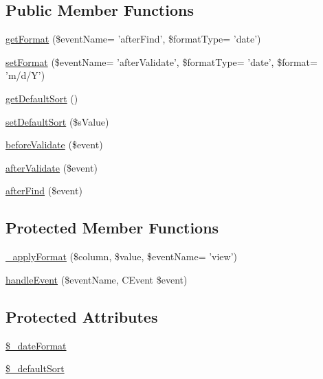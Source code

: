 \subsection*{Public Member Functions}
\begin{DoxyCompactItemize}
\item 
\hyperlink{classCXLDataTransformBehavior_a5f5baa468a67090cc67aa9503fdbc6bb}{getFormat} (\$eventName= 'afterFind', \$formatType= 'date')
\item 
\hyperlink{classCXLDataTransformBehavior_a4e91cf22ca23baba52773633bc87b862}{setFormat} (\$eventName= 'afterValidate', \$formatType= 'date', \$format= 'm/d/Y')
\item 
\hyperlink{classCXLDataTransformBehavior_afeb8c05903b3b31d7ec509c3e1628e52}{getDefaultSort} ()
\item 
\hyperlink{classCXLDataTransformBehavior_ad6a3597dea15d20d248e402b0d162490}{setDefaultSort} (\$sValue)
\item 
\hyperlink{group__core__behavior__events_ga586e177c0e7073ec63f7ccd6546ff3fd}{beforeValidate} (\$event)
\item 
\hyperlink{group__core__behavior__events_ga5c1ea11a48a8c9bde21ef9a7d391d396}{afterValidate} (\$event)
\item 
\hyperlink{group__core__behavior__events_ga3b701d16073e1628451c7dc1929b66bb}{afterFind} (\$event)
\end{DoxyCompactItemize}
\subsection*{Protected Member Functions}
\begin{DoxyCompactItemize}
\item 
\hyperlink{classCXLDataTransformBehavior_a2d3ccb7aedca82d5a4ee684f85ae5f0d}{\_\-applyFormat} (\$column, \$value, \$eventName= 'view')
\item 
\hyperlink{classCXLDataTransformBehavior_abc970681d914624e7c53ce91ee36c9da}{handleEvent} (\$eventName, CEvent \$event)
\end{DoxyCompactItemize}
\subsection*{Protected Attributes}
\begin{DoxyCompactItemize}
\item 
\hyperlink{classCXLDataTransformBehavior_ab9c3692fec45d84a91a926fdd974fe14}{\$\_\-dateFormat}
\item 
\hyperlink{classCXLDataTransformBehavior_ae5efd596975c96b8330c6b70cd116a79}{\$\_\-defaultSort}
\end{DoxyCompactItemize}



